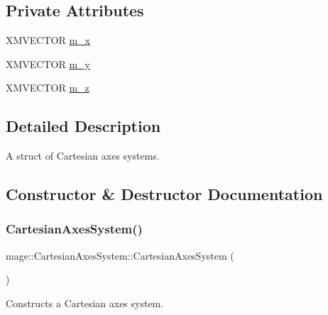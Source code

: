 \subsection*{Private Attributes}
\begin{DoxyCompactItemize}
\item 
X\+M\+V\+E\+C\+T\+OR \hyperlink{structmage_1_1_cartesian_axes_system_aa840c10ca92782e8c87c1ab53f0b86e9}{m\+\_\+x}
\item 
X\+M\+V\+E\+C\+T\+OR \hyperlink{structmage_1_1_cartesian_axes_system_a2cc6bc4fe185791a877e1418e85d6b47}{m\+\_\+y}
\item 
X\+M\+V\+E\+C\+T\+OR \hyperlink{structmage_1_1_cartesian_axes_system_abc733e5f82104391b0b352d263313d64}{m\+\_\+z}
\end{DoxyCompactItemize}


\subsection{Detailed Description}
A struct of Cartesian axes systems. 

\subsection{Constructor \& Destructor Documentation}
\hypertarget{structmage_1_1_cartesian_axes_system_a8f6ebcd50aafda44c478b7aa25e1fd25}{}\label{structmage_1_1_cartesian_axes_system_a8f6ebcd50aafda44c478b7aa25e1fd25} 
\subsubsection{\texorpdfstring{Cartesian\+Axes\+System()}{CartesianAxesSystem()}\hspace{0.1cm}{\footnotesize\ttfamily [1/5]}}
{\footnotesize\ttfamily mage\+::\+Cartesian\+Axes\+System\+::\+Cartesian\+Axes\+System (\begin{DoxyParamCaption}{ }\end{DoxyParamCaption})}

Constructs a Cartesian axes system. \hypertarget{structmage_1_1_cartesian_axes_system_afd22b658e9221086add8c41958394568}{}\label{structmage_1_1_cartesian_axes_system_afd22b658e9221086add8c41958394568} 
